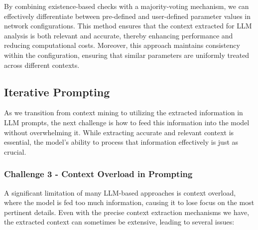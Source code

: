 By combining existence-based checks with a majority-voting mechanism, we can effectively differentiate between pre-defined and user-defined parameter values in network configurations. This method ensures that the context extracted for LLM analysis is both relevant and accurate, thereby enhancing performance and reducing computational costs. Moreover, this approach maintains consistency within the configuration, ensuring that similar parameters are uniformly treated across different contexts.


\subsection{Iterative Prompting}\label{prompting_method}
As we transition from context mining to utilizing the extracted information in LLM prompts, the next challenge is how to feed this information into the model without overwhelming it. While extracting accurate and relevant context is essential, the model's ability to process that information effectively is just as crucial.


\subsubsection{Challenge 3 - Context Overload in Prompting}
\label{challenge_3}
A significant limitation of many LLM-based approaches is context overload, where the model is fed too much information, causing it to lose focus on the most pertinent details.
Even with the precise context extraction mechanisms we have, the extracted context can sometimes be extensive,
leading to several issues:

